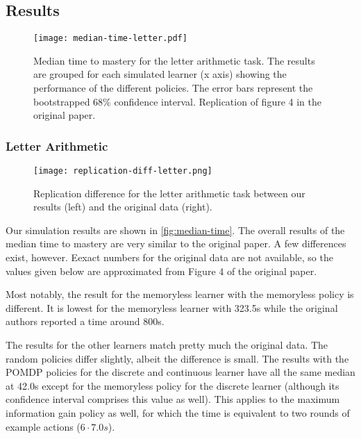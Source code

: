 \subsection{Results}

\begin{figure}
    \centering
    \texttt{[image: median-time-letter.pdf]}
    \caption{Median time to mastery for the letter arithmetic task. The results are grouped for each simulated learner (x axis) showing the performance of the different policies. The error bars represent the bootstrapped 68\% confidence interval. Replication of figure 4 in the original paper.
    }
    \label{fig:median-time}
\end{figure}



\subsubsection{Letter Arithmetic}

\begin{figure}
    \centering
    \texttt{[image: replication-diff-letter.png]}
    \caption{Replication difference for the letter arithmetic task between our results (left) and the original data (right).
    }
    \label{fig:difference-t1}
\end{figure}


Our simulation results are shown in \autoref{fig:median-time}.
The overall results of the median time to mastery are very similar to the original paper.
A few differences exist, however. Eexact numbers for the original data are not available, so the values given below are approximated from Figure 4 of the original paper. 

Most notably, the result for the memoryless learner with the memoryless policy is different. It is lowest for the memoryless learner with 323.5s while the original authors reported a time around 800s. %

The results for the other learners match pretty much the original data. 
The random policies differ slightly, albeit the difference is small.
The results with the POMDP policies for the discrete and continuous learner have all the same median at 42.0s except for the memoryless policy for the discrete learner (although its confidence interval comprises this value as well).
This applies to the maximum information gain policy as well, for which the time is equivalent to two rounds of example actions ($6 \cdot 7.0s$).

